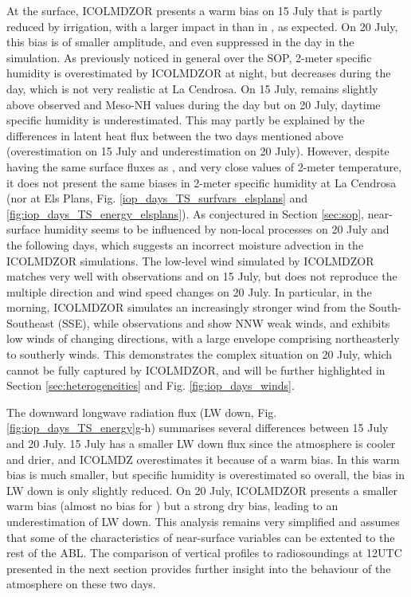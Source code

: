 At the surface, ICOLMDZOR presents a warm bias on 15 July that is partly reduced by irrigation, with a larger impact in \irrboost than in \irr, as expected. On 20 July, this bias is of smaller amplitude, and even suppressed in the day in the \irrboost simulation.
As previously noticed in general over the SOP, 2-meter specific humidity is overestimated by ICOLMDZOR at night, but decreases during the day, which is not very realistic at La Cendrosa. On 15 July, \irrboost remains slightly above observed and Meso-NH values during the day but on 20 July, daytime specific humidity is underestimated.
This may partly be explained by the differences in latent heat flux between the two days mentioned above (overestimation on 15 July and underestimation on 20 July).
However, despite \mesomean having the same surface fluxes as \irrboost, and very close values of 2-meter temperature, it does not present the same biases in 2-meter specific humidity at La Cendrosa (nor at Els Plans, Fig. \ref{iop_days_TS_surfvars_elsplans} and \ref{fig:iop_days_TS_energy_elsplans}).
As conjectured in Section \ref{sec:sop}, near-surface humidity seems to be influenced by non-local processes on 20 July and the following days, which suggests an incorrect moisture advection in the ICOLMDZOR simulations. 
The low-level wind simulated by ICOLMDZOR matches very well with observations and \mesomean on 15 July, but does not reproduce the multiple direction and wind speed changes on 20 July. In particular, in the morning, ICOLMDZOR simulates an increasingly stronger wind from the South-Southeast (SSE), while observations and \mesoexact show NNW weak winds, and \mesomean exhibits low winds of changing directions, with a large envelope comprising northeasterly to southerly winds. This demonstrates the complex situation on 20 July, which cannot be fully captured by ICOLMDZOR, and will be further highlighted in Section \ref{sec:heterogeneities} and Fig. \ref{fig:iop_days_winds}.

The downward longwave radiation flux (LW down, Fig. \ref{fig:iop_days_TS_energy}g-h) summarises several differences between 15 July and 20 July. 
15 July has a smaller LW down flux since the atmosphere is cooler and drier, and ICOLMDZ overestimates it because of a warm bias. In \irrboost this warm bias is much smaller, but specific humidity is overestimated so overall, the bias in LW down is only slightly reduced. 
On 20 July, ICOLMDZOR presents a smaller warm bias (almost no bias for \irrboost) but a strong dry bias, leading to an underestimation of LW down. 
This analysis remains very simplified and assumes that some of the characteristics of near-surface variables can be extented to the rest of the ABL. The comparison of vertical profiles to radiosoundings at 12UTC presented in the next section provides further insight into the behaviour of the atmosphere on these two days.

